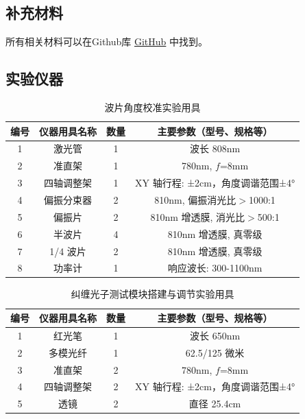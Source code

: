 \subsection{补充材料}

所有相关材料可以在Github库 \href{https://github.com}{GitHub} 中找到。

\subsection{实验仪器}

\begin{table}[h!]
	\centering
	\caption{波片角度校准实验用具}
	\begin{tabular}{cccc}
		\hline
		\textbf{编号} & \textbf{仪器用具名称} & \textbf{数量} & \textbf{主要参数（型号、规格等）} \\ \hline
		1 & 激光管 & 1 & 波长 808nm \\ 
		2 & 准直架 & 1 & 780nm, $f$=8mm \\ 
		3 & 四轴调整架 & 1 & XY 轴行程: ±2cm，角度调谐范围±4° \\ 
		4 & 偏振分束器 & 2 & 810nm, 偏振消光比$>$1000:1 \\ 
		5 & 偏振片 & 2 & 810nm 增透膜, 消光比$>$500:1 \\ 
		6 & 半波片 & 4 & 810nm 增透膜, 真零级 \\ 
		7 & 1/4 波片 & 2 & 810nm 增透膜, 真零级 \\ 
		8 & 功率计 & 1 & 响应波长: 300-1100nm \\ \hline
	\end{tabular}
\end{table}

\begin{table}[h!]
	\centering
	\caption{纠缠光子测试模块搭建与调节实验用具}
	\begin{tabular}{cccc}
		\hline
		\textbf{编号} & \textbf{仪器用具名称} & \textbf{数量} & \textbf{主要参数（型号、规格等）} \\ \hline
		1 & 红光笔 & 1 & 波长 650nm \\ 
		2 & 多模光纤 & 1 & 62.5/125 微米 \\ 
		3 & 准直架 & 2 & 780nm, $f$=8mm \\ 
		4 & 四轴调整架 & 2 & XY 轴行程: ±2cm，角度调谐范围±4° \\ 
		5 & 透镜 & 2 & 直径 25.4cm \\ \hline
	\end{tabular}
\end{table}

